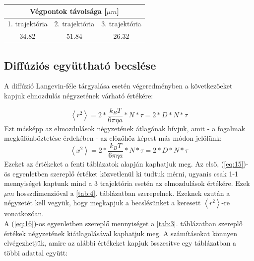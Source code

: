 \begin{center}
\label{tab:4}
\begin{tabular}{||c|c|c||}
    \toprule
    \multicolumn{3}{||c||}{Végpontok távolsága [$\mu m$]} \\
    \hline
    1. trajektória  & 2. trajektória  & 3. trajektória \\ \hline \hline
    34.82           & 51.84           & 26.32          \\
    \bottomrule
\end{tabular}
\end{center}

\newpage

\subsection{Diffúziós együttható becslése}
A diffúzió Langevin-féle tárgyalása esetén végeredményben a következőeket kapjuk elmozdulás négyzetének várható értékére:

\begin{equation} \label{eq:15}
    \left< r^{2} \right>
    =
    2 * \frac{k_{B} T}{6 \pi \eta a} * N * \tau
    =
    2 * D * N * \tau
\end{equation}
Ezt másképp az elmozdulások négyzetének átlagának hívjuk, amit - a fogalmak megkülönböztetése érdekében - az előzőhöz képest más módon jelölünk:
\begin{equation} \label{eq:16}
    \left< x^{2} \right>
    =
    2 * \frac{k_{B} T}{6 \pi \eta a} * N * \tau
    =
    2 * D * N * \tau
\end{equation}
Ezeket az értékeket a fenti táblázatok alapján kaphatjuk meg. Az első, (\ref{eq:15})-ös egyenletben szereplő értéket közvetlenül ki tudtuk mérni, ugyanis csak 1-1 mennyiséget kaptunk mind a 3 trajektória esetén az elmozdulások értékére. Ezek $\mu m$ hosszdimenzióval a \ref{tab:4}. táblázatban szerepelnek. Ezeknek ezután a négyzetét kell vegyük, hogy megkapjuk a becslésünket a keresett $\left< r^{2} \right>$-re vonatkozóan. \\
A (\ref{eq:16})-os egyenletben szereplő mennyiséget a \ref{tab:3}. táblázatban szereplő értékek négyzetének kiátlagolásával kaphatjuk meg. A számításokat könnyen elvégezhetjük, amire az alábbi értékeket kapjuk összesítve egy táblázatban a többi adattal együtt:

